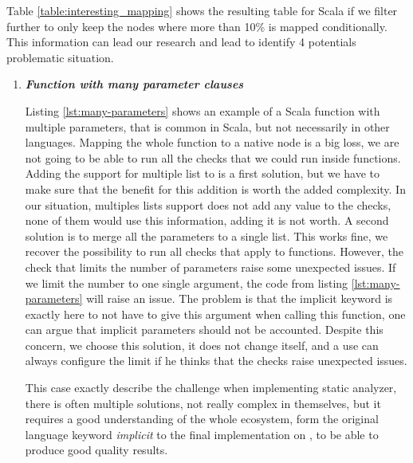 Table \ref{table:interesting_mapping} shows the resulting table for Scala if we filter further to only keep the nodes where more than 10\% is mapped conditionally. 
This information can lead our research and lead to identify 4 potentials problematic situation.

\begin{enumerate}
	\item \textbf{\textit{Function with many parameter clauses}} \newline 
	
	
	Listing \ref{lst:many-parameters} shows an example of a Scala function with multiple parameters, that is common in Scala, but not necessarily in other languages. 
	Mapping the whole function to a native node is a big loss, we are not going to be able to run all the checks that we could run inside functions.
	Adding the support for multiple list to \slang{} is a first solution, but we have to make sure that the benefit for this addition is worth the added complexity.
	In our situation, multiples lists support does not add any value to the checks, none of them would use this information, adding it is not worth.
	A second solution is to merge all the parameters to a single list.
	This works fine, we recover the possibility to run all checks that apply to functions.
	However, the check that limits the number of parameters raise some unexpected issues.
	If we limit the number to one single argument, the code from listing \ref{lst:many-parameters} will raise an issue.
	The problem is that the implicit keyword is exactly here to not have to give this argument when calling this function, one can argue that implicit parameters should not be accounted.
	Despite this concern, we choose this solution, it does not change \slang{} itself, and a use can always configure the limit if he thinks that the checks raise unexpected issues.
	
	This case exactly describe the challenge when implementing static analyzer, there is often multiple solutions, not really complex in themselves, but it requires a good understanding of the whole ecosystem, form the original language keyword \emph{implicit} to the final implementation on \slang{}, to be able to produce good quality results.
	

\end{enumerate}
